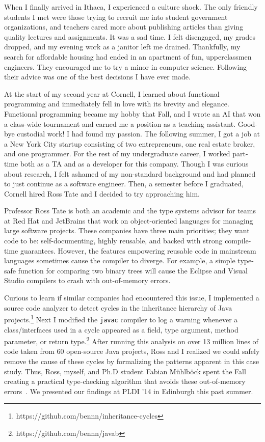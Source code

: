 \documentclass[12pt]{article}
\newcommand{\hdr}[2]{\vspace{-0.4cm}{\flushleft{\hrulefill\\\textbf{#1}\hfill{#2}\\\vspace{-0.2cm}\hrulefill}}\vspace{0.1cm}}
\begin{document}
When I finally arrived in Ithaca, I experienced a culture shock.
The only friendly students I met were those trying to recruit me into student government organizations, and teachers cared more about publishing articles than giving quality lectures and assignments.
It was a sad time.
I felt disengaged, my grades dropped, and my evening work as a janitor left me drained.
Thankfully, my search for affordable housing had ended in an apartment of fun, upperclassmen engineers.
They encouraged me to try a minor in computer science.
Following their advice was one of the best decisions I have ever made.

At the start of my second year at Cornell, I learned about functional programming and immediately fell in love with its brevity and elegance.
Functional programming became my hobby that Fall, and I wrote an AI that won a class-wide tournament and earned me a position as a teaching assistant.
Good-bye custodial work!
I had found my passion.
The following summer, I got a job at a New York City startup consisting of two entrepreneurs, one real estate broker, and one programmer.
For the rest of my undergraduate career, I worked part-time both as a TA and as a developer for this company.
Though I was curious about research, I felt ashamed of my non-standard background and had planned to just continue as a software engineer.
Then, a semester before I graduated, Cornell hired Ross Tate and I decided to try approaching him.

\hdr{Decidable Subtyping for Object-Oriented Languages}{Summer~\textendash~Fall 2013}

Professor Ross Tate is both an academic and the type systems advisor for teams at Red Hat and JetBrains that work on object-oriented languages for managing large software projects.
These companies have three main priorities; they want code to be: self-documenting, highly reusable, and backed with strong compile-time guarantees.
However, the features empowering reusable code in mainstream languages sometimes cause the compiler to diverge.
For example, a simple type-safe function for comparing two binary trees will cause the Eclipse and Visual Studio compilers to crash with out-of-memory errors.

Curious to learn if similar companies had encountered this issue, I implemented a source code analyzer to detect cycles in the inheritance hierarchy of Java projects.\footnote{https://github.com/bennn/inheritance-cycles}
Next I modified the \texttt{javac} compiler to log a warning whenever a class/interfaces used in a cycle appeared as a field, type argument, method parameter, or return type.\footnote{https://github.com/bennn/javab}
After running this analysis on over 13 million lines of code taken from 60 open-source Java projects, Ross and I realized we could safely remove the cause of these cycles by formalizing the patterns apparent in this case study.
Thus, Ross, myself, and Ph.D student Fabian M\"uhlb\"ock spent the Fall creating a practical type-checking algorithm that avoids these out-of-memory errors~\cite{shapes}.
We presented our findings at PLDI '14 in Edinburgh this past summer.
\end{document}
